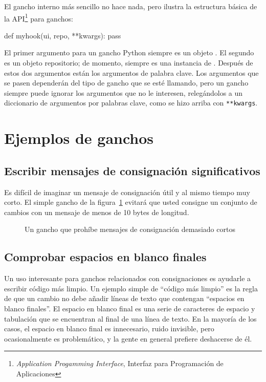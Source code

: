 El gancho interno más sencillo no hace nada, pero ilustra la
estructura básica de la API\footnote{\emph{Application Progamming
Interface}, Interfaz para Programación de Aplicaciones} para ganchos:
\begin{codesample2}
  def myhook(ui, repo, **kwargs):
      pass
\end{codesample2}
El primer argumento para un gancho Python siempre es un objeto
.  El segundo es un objeto repositorio;
de momento, siempre es una instancia de 
.  Después de estos
dos argumentos están los argumentos de palabra clave. Los argumentos
que se pasen dependerán del tipo de gancho que se esté llamando, pero
un gancho siempre puede ignorar los argumentos que no le interesen,
relegándolos a un diccionario de argumentos por palabras clave, como se
hizo arriba con \texttt{**kwargs}.

\section{Ejemplos de ganchos}

\subsection{Escribir mensajes de consignación significativos}

Es difícil de imaginar un mensaje de consignación útil y al mismo
tiempo muy corto. El simple gancho  de la
figura~\ref{ex:hook:msglen.go} evitará que usted consigne un conjunto
de cambios con un mensaje de menos de 10 bytes de longitud.

\begin{figure}[ht]
  \caption{Un gancho que prohíbe mensajes de consignación demasiado
  cortos}
  \label{ex:hook:msglen.go}
\end{figure}

\subsection{Comprobar espacios en blanco finales}

Un uso interesante para ganchos relacionados con consignaciones es
ayudarle a escribir código más limpio. Un ejemplo simple de
``código más limpio'' es la regla de que un cambio no debe añadir
líneas de texto que contengan ``espacios en blanco finales''. El
espacio en blanco final es una serie de caracteres de espacio y
tabulación que se encuentran al final de una línea de texto. En la
mayoría de los casos, el espacio en blanco final es innecesario, ruido
invisible, pero ocasionalmente es problemático, y la gente en general
prefiere deshacerse de él.

